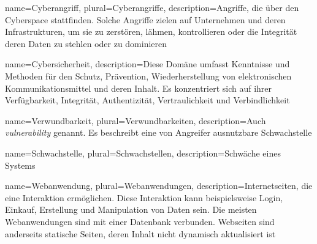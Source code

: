 


 {
    name={Cyberangriff},
    plural={Cyberangriffe},
    description={Angriffe, die über den Cyberspace stattfinden. Solche Angriffe zielen auf Unternehmen und deren Infrastrukturen, um sie zu zerstören, lähmen, kontrollieren oder die Integrität deren Daten zu stehlen oder zu dominieren \citep{NIST_Definitionen}}
}

 {
    name={Cybersicherheit},
    description={Diese Domäne umfasst Kenntnisse und Methoden für den Schutz, Prävention, Wiederherstellung von elektronischen Kommunikationsmittel und deren Inhalt. Es konzentriert sich auf ihrer Verfügbarkeit, Integrität, Authentizität, Vertraulichkeit und Verbindlichkeit \citep{NIST_Definitionen}}
}

 {
    name={Verwundbarkeit},
    plural={Verwundbarkeiten},
    description={Auch \textit{vulnerability} genannt. Es beschreibt eine von Angreifer ausnutzbare Schwachstelle \citep{Wendzel_It-Sicherheit}}
}

 {
    name={Schwachstelle},
    plural={Schwachstellen},
    description={Schwäche eines Systems \citep{Wendzel_It-Sicherheit}}
}

 {
    name={Webanwendung},
    plural={Webanwendungen},
    description={Internetseiten, die eine Interaktion ermöglichen. Diese Interaktion kann beispielsweise Login, Einkauf, Erstellung und Manipulation von Daten sein. Die meisten Webanwendungen sind mit einer Datenbank verbunden. Webseiten sind anderseits statische Seiten, deren Inhalt nicht dynamisch aktualisiert ist \citep{Essential_Desigs_Seite_x_Anwendung}}
}

